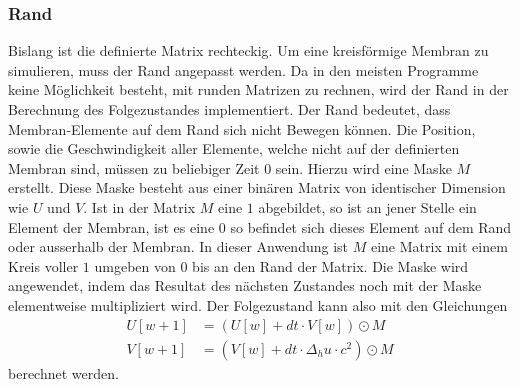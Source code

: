 \subsubsection{Rand}
Bislang ist die definierte Matrix rechteckig.
Um eine kreisförmige Membran zu simulieren, muss der Rand angepasst werden.
Da in den meisten Programme keine Möglichkeit besteht, mit runden Matrizen zu rechnen, wird der Rand in der Berechnung des Folgezustandes implementiert.
Der Rand bedeutet, dass Membran-Elemente auf dem Rand sich nicht Bewegen können.
Die Position, sowie die Geschwindigkeit aller Elemente, welche nicht auf der definierten Membran sind, müssen zu beliebiger Zeit $0$ sein.
Hierzu wird eine Maske $M$ erstellt. 
Diese Maske besteht aus einer binären Matrix von identischer Dimension wie $ U $ und $ V $. 
Ist in der Matrix $M$ eine $1$ abgebildet, so ist an jener Stelle ein Element der Membran, ist es eine $0$ so befindet sich dieses Element auf dem Rand oder ausserhalb der Membran.
In dieser Anwendung ist $M$ eine Matrix mit einem Kreis voller $1$ umgeben von $0$ bis an den Rand der Matrix.
Die Maske wird angewendet, indem das Resultat des nächsten Zustandes noch mit der Maske elementweise multipliziert wird. 
Der Folgezustand kann also mit den Gleichungen
\begin{align}
	\label{kreismembran:eq:folge_U} 
	U[w+1] &= (U[w] + dt \cdot V[w])\odot M\\
	\label{kreismembran:eq:folge_V}
	V[w+1] &= (V[w] + dt \cdot \Delta_h u \cdot c^2)\odot M
\end{align}
berechnet werden.
